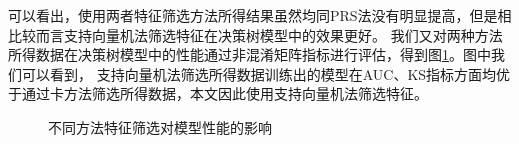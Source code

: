 可以看出，使用两者特征筛选方法所得结果虽然均同PRS法没有明显提高，但是相比较而言支持向量机法筛选特征在决策树模型中的效果更好。
我们又对两种方法所得数据在决策树模型中的性能通过非混淆矩阵指标进行评估，得到图\ref{fig:featureselection}。图中我们可以看到，
支持向量机法筛选所得数据训练出的模型在AUC、KS指标方面均优于通过卡方法筛选所得数据，本文因此使用支持向量机法筛选特征。

\begin{figure}[ht]
\centering
{}
\quad
{}
\quad
{}
\quad
{}
\caption{不同方法特征筛选对模型性能的影响}
\label{fig:featureselection}
\end{figure}

